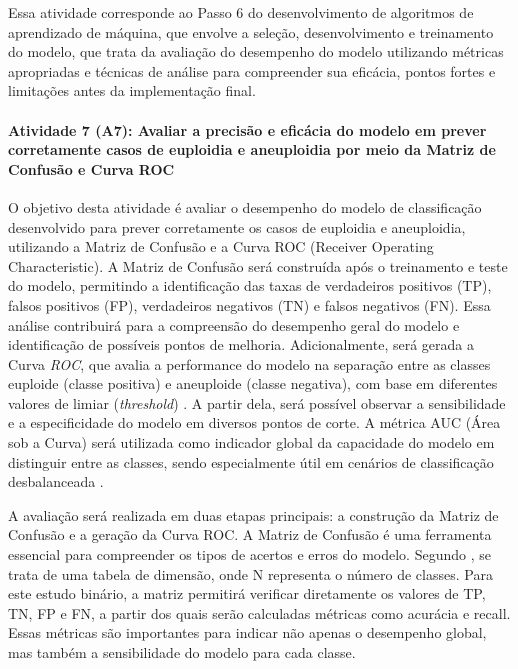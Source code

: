 Essa atividade corresponde ao Passo 6 do desenvolvimento de algoritmos de aprendizado de máquina, que envolve a seleção, desenvolvimento e treinamento do modelo, que trata da avaliação do desempenho do modelo utilizando métricas apropriadas e técnicas de análise para compreender sua eficácia, pontos fortes e limitações antes da implementação final.

\paragraph{\textbf{Atividade 7 (A7):} Avaliar a precisão e eficácia do modelo em prever corretamente casos de euploidia e aneuploidia  por meio da Matriz de Confusão e Curva ROC}

O objetivo desta atividade é avaliar o desempenho do modelo de classificação desenvolvido para prever corretamente os casos de euploidia e aneuploidia, utilizando a Matriz de Confusão e a Curva ROC (Receiver Operating Characteristic). A Matriz de Confusão será construída após o treinamento e teste do modelo, permitindo a identificação das taxas de verdadeiros positivos (TP), falsos positivos (FP), verdadeiros negativos (TN) e falsos negativos (FN). Essa análise contribuirá para a compreensão do desempenho geral do modelo e identificação de possíveis pontos de melhoria. Adicionalmente, será gerada a Curva \textit{ROC}, que avalia a performance do modelo na separação entre as classes euploide (classe positiva) e aneuploide (classe negativa), com base em diferentes valores de limiar (\textit{threshold}) \cite{vilela2022}. A partir dela, será possível observar a sensibilidade e a especificidade do modelo em diversos pontos de corte. A métrica AUC (Área sob a Curva) será utilizada como indicador global da capacidade do modelo em distinguir entre as classes, sendo especialmente útil em cenários de classificação desbalanceada \cite{vilela2022}.

A avaliação será realizada em duas etapas principais: a construção da Matriz de Confusão e a geração da Curva ROC. A Matriz de Confusão é uma ferramenta essencial para compreender os tipos de acertos e erros do modelo. Segundo , se trata de uma tabela de dimensão, onde N representa o número de classes. Para este estudo binário, a matriz permitirá verificar diretamente os valores de TP, TN, FP e FN, a partir dos quais serão calculadas métricas como acurácia e recall. Essas métricas são importantes para indicar não apenas o desempenho global, mas também a sensibilidade do modelo para cada classe.

